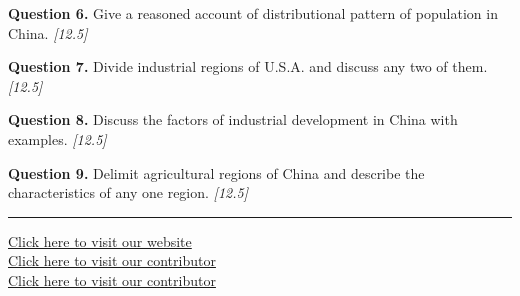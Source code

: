 \documentclass[11pt,a4paper]{article}
\newcommand{\pts}[1]{\hfill   \textit{[#1]}}
\begin{document}
\noindent   \textbf{Question 6.} Give a reasoned account of distributional pattern of population in China. \pts{12.5}

\medskip


\noindent   \textbf{Question 7.} Divide industrial regions of U.S.A. and discuss any two of them. \pts{12.5}

\medskip


\noindent   \textbf{Question 8.} Discuss the factors of industrial development in China with examples. \pts{12.5}

\medskip


\noindent   \textbf{Question 9.} Delimit agricultural regions of China and describe the characteristics of any one region. \pts{12.5}

\vfill\rule{\linewidth}{0.4pt}

\begin{center}\small
\href{https://bhu-exam.vercel.app/}{Click here to visit our website}\\[4pt]
\href{https://me-aryan.vercel.app/}{Click here to visit our contributor}\\[4pt]
\href{https://quashan-me.vercel.app/}{Click here to visit our contributor}
\end{center}
\end{document}
